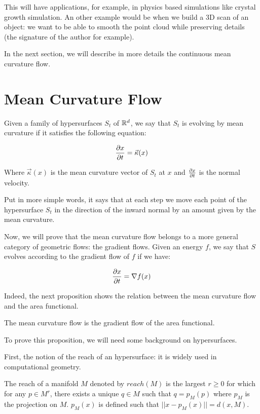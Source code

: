 This will have applications, for example, in physics based simulations like
crystal growth simulation.  An other example would be when we build a 3D scan of
an object: we want to be able to smooth the point cloud while preserving details
(the signature of the author for example).

In the next section, we will describe in more details the continuous mean
curvature flow.


\section{Mean Curvature Flow}

Given a family of hypersurfaces $ S_t $ of $ \mathbb{R}^d $, we say that $ S_t $ is
evolving by mean curvature if it satisfies the following equation:

$$ \frac{\partial{x}}{\partial{t}} = \vec{\kappa}(x) $$

Where $ \vec{\kappa}(x) $ is the mean curvature vector of $ S_t $ at $ x $ and
$ \frac{\partial{x}}{\partial{t}} $ is the normal velocity.

Put in more simple words, it says that at each step we move each point of the
hypersurface $ S_t $ in the direction of the inward normal by an amount given by
the mean curvature.

Now, we will prove that the mean curvature flow belongs to a more general
category of geometric flows: the gradient flows. Given an energy $ f $, we say
that $ S $ evolves according to the gradient flow of $ f $ if we have:

$$ \frac{\partial{x}}{\partial{t}} = \nabla f(x) $$

Indeed, the next proposition shows the relation between the mean curvature flow
and the area functional.

\begin{proposition}
    The mean curvature flow is the gradient flow of the area functional.
\end{proposition}

To prove this proposition, we will need some background on hypersurfaces.

First, the notion of the reach of an hypersurface: it is widely used in
computational geometry.
\begin{definition}
    The reach of a manifold $ M $ denoted by $ reach(M) $ is the largest $ r
    \geq 0 $ for which for any $ p \in M^r $, there exists a unique $ q \in M $
    such that $ q = p_M(p) $ where $ p_M $ is the projection on $ M $. $ p_M(x)
    $ is defined such that $ || x - p_M(x) || = d(x, M) $.
\end{definition}

